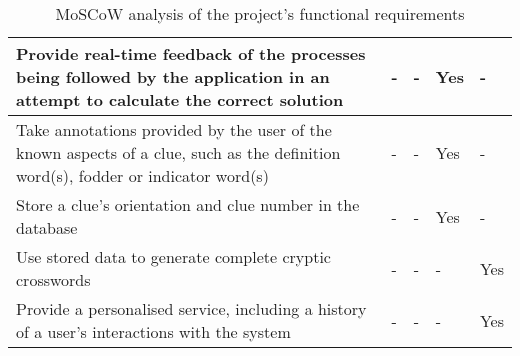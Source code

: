 \begin{table}[H]
\begin{tabular}{|p{9.3cm}|p{1.3cm}|p{1.3cm}|p{1.3cm}|p{1.3cm}|}
    Provide real-time feedback of the processes being followed by the application in an attempt to calculate the correct solution &
    - & - & Yes & - \\ \hline

    Take annotations provided by the user of the known aspects of a clue, such as the definition word(s), fodder or indicator word(s) &
    - & - & Yes & - \\ \hline

    Store a clue's orientation and clue number in the database &
    - & - & Yes & - \\ \hline

    Use stored data to generate complete cryptic crosswords &
    - & - & - & Yes \\ \hline

    Provide a personalised service, including a history of a user's interactions with the system &
    - & - & - & Yes \\ \hline

    \end{tabular}
    \caption {MoSCoW analysis of the project's functional requirements}
\end{table}